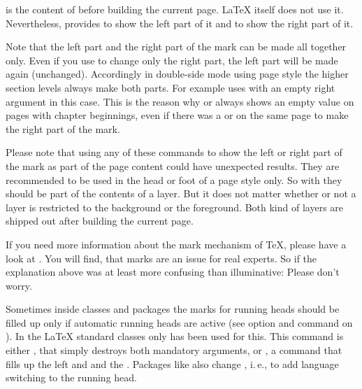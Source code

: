  is the content of  before building the current
page. \LaTeX{} itself does not use it. Nevertheless, 
provides  to show the left part of it and
 to show the right part of it.

Note that the left part and the right part of the mark
can be made all together only. Even if you use
 to change only the right part, the left
part will be made again (unchanged). Accordingly in double-side mode using
page style
the higher section levels always make both parts. For example
 uses  with an empty right argument in this
case. This is the reason why  or 
always shows an empty value on pages with chapter beginnings, even if there
was a  or  on the same page to make the
right part of the mark.

Please note that using any of these commands to show the
left or right part of the mark as part of the page content could have
unexpected results. They are recommended to be used in the head or foot of a
page style only. So with  they should be part of the
contents of a layer. But it does not matter whether or not a layer is
restricted to the background or the foreground. Both kind of layers are
shipped out after building the current page.

If you need more information about the mark mechanism of \TeX, please have a
look at \cite[chapter~23]{knuth:texbook}. You will find, that marks are an
issue for real experts. So if the explanation above was at least more
confusing than illuminative: Please don't worry.
%
\EndIndexGroup


\begin{Declaration}
\end{Declaration}
Sometimes inside classes and packages the marks for running heads should be
filled up only if automatic running heads are active (see option
 and command  on
). In the \LaTeX{} standard
classes only  has been used for this. This command is either
, that simply destroys both mandatory arguments, or
, a command that fills up the left and  and
the . Packages like  also change
\Macro{\@mkboth}, i.\,e., to add language switching to the running head.

